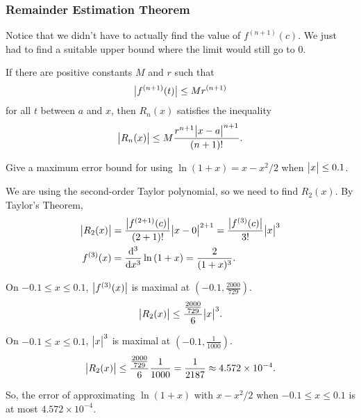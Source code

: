 \subsubsection{Remainder Estimation Theorem}
Notice that we didn't have to actually find the value of $f^{(n+1)}(c)$.
We just had to find a suitable upper bound where the limit would still go to 0.
\begin{theorem}
	If there are positive constants $M$ and $r$ such that
	\begin{equation*}
		\big\lvert f^{(n+1)}(t) \big\rvert \leq Mr^{(n+1)}
	\end{equation*}
	for all $t$ between $a$ and $x$, then $R_n(x)$ satisfies the inequality
	\begin{equation*}
		\big\lvert R_n(x) \big\rvert \leq M\frac{r^{n+1}\big\lvert x-a \big\rvert^{n+1}}{(n+1)!}.
	\end{equation*}
\end{theorem}

\begin{example}
	Give a maximum error bound for using $\ln{(1+x)} = x - x^2/2$ when $\big\lvert x \big\rvert \leq 0.1$.
\end{example}
\begin{answer}
	We are using the second-order Taylor polynomial, so we need to find $R_2(x)$.
	By Taylor's Theorem,
	\begin{align*}
		\big\lvert R_2(x) \big\rvert &= \frac{\big\lvert f^{(2+1)}(c) \big\rvert}{(2+1)!}\big\lvert x-0 \big\rvert^{2+1}  = \frac{\big\lvert f^{(3)}(c) \big\rvert}{3!}\big\lvert x \big\rvert^3\\
		f^{(3)}(x) &= \frac{\mathrm{d} ^3}{\mathrm{d} x^3}\ln{(1+x)} = \frac{2}{(1+x)^3}.
	\end{align*}
	
	On $-0.1 \leq x \leq 0.1$, $\big\lvert f^{(3)}(x) \big\rvert$ is maximal at $(-0.1, \frac{2000}{729})$.
	\begin{equation*}
		\big\lvert R_2(x) \big\rvert \leq \frac{\frac{2000}{729}}{6}\big\lvert x \big\rvert^3.
	\end{equation*}
	
	On $-0.1 \leq x \leq 0.1$, $\big\lvert x \big\rvert^3$ is maximal at $(-0.1, \frac{1}{1000})$.
	\begin{equation*}
		\big\lvert R_2(x) \big\rvert \leq \frac{\frac{2000}{729}}{6}\frac{1}{1000} = \frac{1}{2187} \approx 4.572 \times 10^{-4}.
	\end{equation*}
	
	So, the error of approximating $\ln{(1+x)}$ with $x-x^2/2$ when $-0.1 \leq x \leq 0.1$ is at most $4.572 \times 10^{-4}$.
\end{answer}